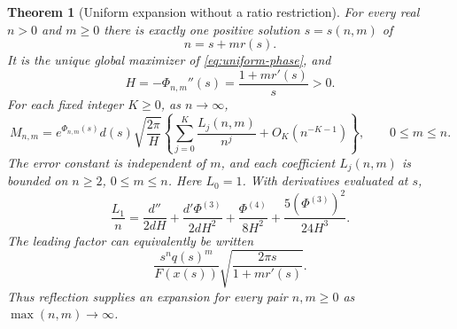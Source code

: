 \documentclass[11pt,letterpaper]{article}
\newtheorem{theorem}{Theorem}[section]
\theoremstyle{definition}
\theoremstyle{remark}
\begin{document}
\begin{theorem}[Uniform expansion without a ratio restriction]
\label{thm:all-ratio}
For every real $n>0$ and $m\ge0$ there is exactly one positive solution
$s=s(n,m)$ of
\begin{equation}\label{eq:uniform-saddle}
 n=s+m r(s).
\end{equation}
It is the unique global maximizer of \eqref{eq:uniform-phase}, and
\[
 H=-\Phi_{n,m}''(s)=\frac{1+m r'(s)}{s}>0.
\]
For each fixed integer $K\ge0$, as $n\to\infty$,
\begin{equation}\label{eq:uniform-moment-expansion}
 M_{n,m}=e^{\Phi_{n,m}(s)}d(s)\sqrt{\frac{2\pi}{H}}
 \left\{\sum_{j=0}^{K}\frac{L_j(n,m)}{n^j}
                  +O_K(n^{-K-1})\right\},
 \qquad 0\le m\le n.
\end{equation}
The error constant is independent of $m$, and each coefficient
$L_j(n,m)$ is bounded on $n\ge2$, $0\le m\le n$.
Here $L_0=1$. With derivatives evaluated at $s$,
\begin{equation}\label{eq:uniform-first}
 \frac{L_1}{n}=
 \frac{d''}{2dH}
 +\frac{d'\Phi^{(3)}}{2dH^2}
 +\frac{\Phi^{(4)}}{8H^2}
 +\frac{5(\Phi^{(3)})^2}{24H^3}.
\end{equation}
The leading factor can equivalently be written
\begin{equation}\label{eq:uniform-leading-x}
 \frac{s^n q(s)^m}{F(x(s))}
       \sqrt{\frac{2\pi s}{1+m r'(s)}}.
\end{equation}
Thus reflection supplies an expansion for every pair $n,m\ge0$ as
$\max(n,m)\to\infty$.
\end{theorem}
\end{document}
